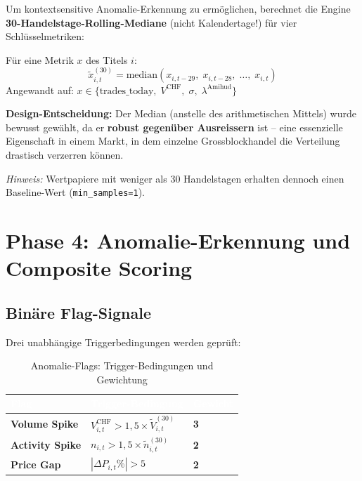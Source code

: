 \documentclass[12pt, a4paper, oneside]{report}
\newcommand{\code}[1]{\texttt{\small\textcolor{darknavy}{#1}}}
\begin{document}
Um kontextsensitive Anomalie-Erkennung zu ermöglichen, berechnet die Engine \textbf{30-Handelstage-Rolling-Mediane} (nicht Kalendertage!) für vier Schlüsselmetriken:

\begin{mathbox}
Für eine Metrik $x$ des Titels $i$:
\[
  \tilde{x}_{i,t}^{(30)} = \text{median}\!\left(x_{i,t-29},\; x_{i,t-28},\; \ldots,\; x_{i,t}\right)
\]
Angewandt auf: $x \in \{\text{trades\_today},\; V^{\text{CHF}},\; \sigma,\; \lambda^{\text{Amihud}}\}$

\textbf{Design-Entscheidung:} Der Median (anstelle des arithmetischen Mittels) wurde bewusst gewählt, da er \textbf{robust gegenüber Ausreissern} ist -- eine essenzielle Eigenschaft in einem Markt, in dem einzelne Grossblockhandel die Verteilung drastisch verzerren können.

\textit{Hinweis:} Wertpapiere mit weniger als 30 Handelstagen erhalten dennoch einen Baseline-Wert (\code{min\_samples=1}).
\end{mathbox}

\section{Phase 4: Anomalie-Erkennung und Composite Scoring}

\subsection{Binäre Flag-Signale}

Drei unabhängige Triggerbedingungen werden geprüft:

\begin{table}[H]
\centering
\caption{Anomalie-Flags: Trigger-Bedingungen und Gewichtung}
\begin{tabularx}{\textwidth}{>{\bfseries\sffamily}p{3cm} X >{\centering\arraybackslash}p{1.5cm}}
  \toprule
  \rowcolor{darknavy} \textcolor{white}{Flag} & \textcolor{white}{Trigger-Bedingung} & \textcolor{white}{Gewicht} \\
  \midrule
  Volume Spike    & $V_{i,t}^{\text{CHF}} > 1{,}5 \times \tilde{V}_{i,t}^{(30)}$ & \textbf{3} \\
  Activity Spike  & $n_{i,t} > 1{,}5 \times \tilde{n}_{i,t}^{(30)}$               & \textbf{2} \\
  Price Gap       & $|\Delta P_{i,t}\%| > 5$                                       & \textbf{2} \\
  \bottomrule
\end{tabularx}
\end{table}
\end{document}
